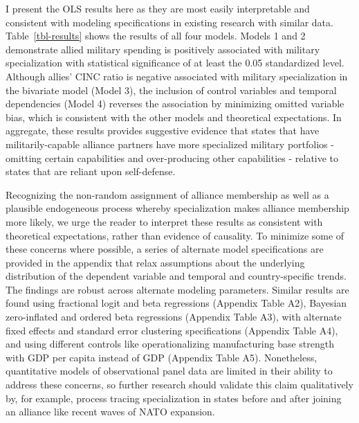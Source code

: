 \documentclass[
  12,
  letterpaper,
  DIV=11,
  numbers=noendperiod]{scrartcl}
\begin{document}
I present the OLS results here as they are most easily interpretable and
consistent with modeling specifications in existing research with
similar data. Table~\ref{tbl-results} shows the results of all four
models. Models 1 and 2 demonstrate allied military spending is
positively associated with military specialization with statistical
significance of at least the 0.05 standardized level. Although allies'
CINC ratio is negative associated with military specialization in the
bivariate model (Model 3), the inclusion of control variables and
temporal dependencies (Model 4) reverses the association by minimizing
omitted variable bias, which is consistent with the other models and
theoretical expectations. In aggregate, these results provides
suggestive evidence that states that have militarily-capable alliance
partners have more specialized military portfolios - omitting certain
capabilities and over-producing other capabilities - relative to states
that are reliant upon self-defense.

Recognizing the non-random assignment of alliance membership as well as
a plausible endogeneous process whereby specialization makes alliance
membership more likely, we urge the reader to interpret these results as
consistent with theoretical expectations, rather than evidence of
causality. To minimize some of these concerns where possible, a series
of alternate model specifications are provided in the appendix that
relax assumptions about the underlying distribution of the dependent
variable and temporal and country-specific trends. The findings are
robust across alternate modeling parameters. Similar results are found
using fractional logit and beta regressions (Appendix Table A2),
Bayesian zero-inflated and ordered beta regressions (Appendix Table A3),
with alternate fixed effects and standard error clustering
specifications (Appendix Table A4), and using different controls like
operationalizing manufacturing base strength with GDP per capita instead
of GDP (Appendix Table A5). Nonetheless, quantitative models of
observational panel data are limited in their ability to address these
concerns, so further research should validate this claim qualitatively
by, for example, process tracing specialization in states before and
after joining an alliance like recent waves of NATO expansion.
\end{document}
